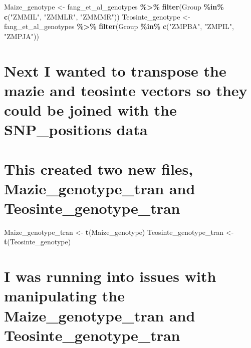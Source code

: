 \documentclass[
]{article}
\newenvironment{Shaded}{\begin{snugshade}}{\end{snugshade}}
\newcommand{\FunctionTok}[1]{\textcolor[rgb]{0.13,0.29,0.53}{\textbf{#1}}}
\newcommand{\NormalTok}[1]{#1}
\newcommand{\OtherTok}[1]{\textcolor[rgb]{0.56,0.35,0.01}{#1}}
\newcommand{\SpecialCharTok}[1]{\textcolor[rgb]{0.81,0.36,0.00}{\textbf{#1}}}
\newcommand{\StringTok}[1]{\textcolor[rgb]{0.31,0.60,0.02}{#1}}
\begin{document}
\begin{Shaded}
\begin{Highlighting}[]
\NormalTok{Maize\_genotype }\OtherTok{\textless{}{-}}\NormalTok{ fang\_et\_al\_genotypes }\SpecialCharTok{\%\textgreater{}\%} \FunctionTok{filter}\NormalTok{(Group }\SpecialCharTok{\%in\%} \FunctionTok{c}\NormalTok{(}\StringTok{"ZMMIL"}\NormalTok{, }\StringTok{"ZMMLR"}\NormalTok{, }\StringTok{"ZMMMR"}\NormalTok{))}
\NormalTok{Teosinte\_genotype }\OtherTok{\textless{}{-}}\NormalTok{ fang\_et\_al\_genotypes }\SpecialCharTok{\%\textgreater{}\%} \FunctionTok{filter}\NormalTok{(Group }\SpecialCharTok{\%in\%} \FunctionTok{c}\NormalTok{(}\StringTok{"ZMPBA"}\NormalTok{, }\StringTok{"ZMPIL"}\NormalTok{, }\StringTok{"ZMPJA"}\NormalTok{))}
\end{Highlighting}
\end{Shaded}

\section{Next I wanted to transpose the mazie and teosinte vectors so
they could be joined with the SNP\_positions
data}\label{next-i-wanted-to-transpose-the-mazie-and-teosinte-vectors-so-they-could-be-joined-with-the-snp_positions-data}

\section{This created two new files, Mazie\_genotype\_tran and
Teosinte\_genotype\_tran}\label{this-created-two-new-files-mazie_genotype_tran-and-teosinte_genotype_tran}

\begin{Shaded}
\begin{Highlighting}[]
\NormalTok{Maize\_genotype\_tran }\OtherTok{\textless{}{-}} \FunctionTok{t}\NormalTok{(Maize\_genotype)}
\NormalTok{Teosinte\_genotype\_tran }\OtherTok{\textless{}{-}} \FunctionTok{t}\NormalTok{(Teosinte\_genotype)}
\end{Highlighting}
\end{Shaded}

\section{I was running into issues with manipulating the
Maize\_genotype\_tran and
Teosinte\_genotype\_tran}\label{i-was-running-into-issues-with-manipulating-the-maize_genotype_tran-and-teosinte_genotype_tran}
\end{document}
